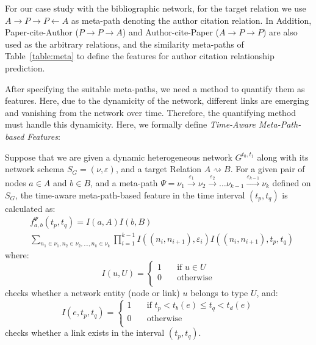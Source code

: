 For our case study with the bibliographic network, for the target relation we use $A\rightarrow P\rightarrow P\leftarrow A$ as meta-path denoting the author citation relation. In Addition, Paper-cite-Author ($P\rightarrow P\rightarrow A$) and Author-cite-Paper ($A\rightarrow P\rightarrow P$) are also used as the arbitrary relations, and the similarity meta-paths of Table~\ref{table:meta} to define the features for author citation relationship prediction.

After specifying the suitable meta-paths, we need a method to quantify them as features. Here, due to the dynamicity of the network, different links are emerging and vanishing from the network over time. Therefore, the quantifying method must handle this dynamicity. Here, we formally define \emph{Time-Aware Meta-Path-based Features}:

\begin{definition}
Suppose that we are given a dynamic heterogeneous network $G^{t_0,t_1}$ along with its network schema $S_G=(\nu, \varepsilon)$, and a target Relation $A\rightsquigarrow B$. For a given pair of nodes $a\in A$ and $b\in B$, and a meta-path $\Psi=\nu_1\xrightarrow{\varepsilon_1}\nu_2\xrightarrow{\varepsilon_2}\dots\nu_{k-1}\xrightarrow{\varepsilon_{k-1}}\nu_k$ defined on $S_G$, the time-aware meta-path-based feature in the time interval $(t_p, t_q)$ is calculated as:
\begin{equation}
\begin{split}
&f_{a,b}^\Psi(t_p,t_q)=I(a,A)I(b,B)\\
&\sum_{n_1\in\nu_1,n_2\in\nu_2,\dots,n_k\in\nu_k}\prod_{i=1}^{k-1}I\left((n_i,n_{i+1}),\varepsilon_i\right)I\left((n_i,n_{i+1}),t_p,t_q\right)
\end{split}
\end{equation}
where:
\[
I(u,U)=
\begin{cases}
1&\quad\text{if } u\in U\\
0&\quad\text{otherwise}\\
\end{cases}
\]
checks whether a network entity (node or link) $u$ belongs to type $U$, and:
\[
I(e,t_p,t_q)=
\begin{cases}
1&\quad\text{if } t_p< t_b(e)\le t_q<t_d(e)\\
0&\quad\text{otherwise}\\
\end{cases}
\]
checks whether a link exists in the interval $(t_p,t_q)$.
\end{definition}


